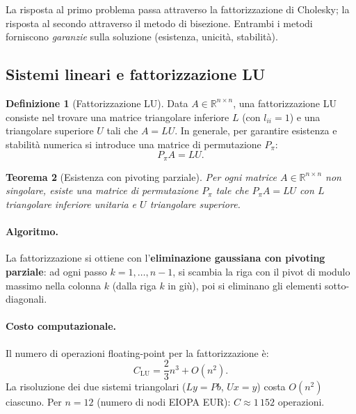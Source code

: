 \documentclass[11pt,a4paper]{article}
\theoremstyle{plain}
\newtheorem{teorema}{Teorema}[section]
\theoremstyle{definition}
\newtheorem{definizione}[teorema]{Definizione}
\theoremstyle{remark}
\newcommand{\R}{\mathbb{R}}
\begin{document}
La risposta al primo problema passa attraverso la fattorizzazione di Cholesky; la risposta
al secondo attraverso il metodo di bisezione. Entrambi i metodi forniscono
\emph{garanzie} sulla soluzione (esistenza, unicità, stabilità).

\subsection{Sistemi lineari e fattorizzazione LU}
\label{sec:lu}

\begin{definizione}[Fattorizzazione LU]
Data $A \in \R^{n\times n}$, una fattorizzazione LU consiste nel trovare una
matrice triangolare inferiore $L$ (con $l_{ii}=1$) e una triangolare superiore $U$
tali che $A = LU$. In generale, per garantire esistenza e stabilit\`a numerica si
introduce una matrice di permutazione $P_\pi$:
\[
  P_\pi A = LU.
\]
\end{definizione}

\begin{teorema}[Esistenza con pivoting parziale]
\label{thm:lu}
Per ogni matrice $A \in \R^{n\times n}$ non singolare, esiste una matrice di
permutazione $P_\pi$ tale che $P_\pi A = LU$ con $L$ triangolare inferiore unitaria
e $U$ triangolare superiore.
\end{teorema}

\paragraph{Algoritmo.}
La fattorizzazione si ottiene con l'\textbf{eliminazione gaussiana con pivoting parziale}:
ad ogni passo $k=1,\ldots,n-1$, si scambia la riga con il pivot di modulo massimo nella
colonna $k$ (dalla riga $k$ in gi\`u), poi si eliminano gli elementi sotto-diagonali.

\paragraph{Costo computazionale.}
Il numero di operazioni floating-point per la fattorizzazione \`e:
\begin{equation}
  \label{eq:costo_lu}
  C_{\text{LU}} = \frac{2}{3}n^3 + O(n^2).
\end{equation}
La risoluzione dei due sistemi triangolari ($Ly=Pb$, $Ux=y$) costa $O(n^2)$ ciascuno.
Per $n=12$ (numero di nodi EIOPA EUR): $C \approx 1\,152$ operazioni.
\end{document}
